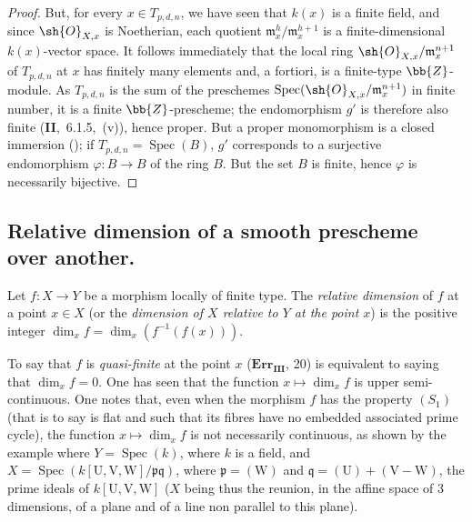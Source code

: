\begin{proof}
But, for every $x\in T_{p,d,n}$, we have seen that $k(x)$ is a finite field, and since $\sh{O}_{X,x}$ is Noetherian, each quotient $\mathfrak{m}_x^h/\mathfrak{m}_x^{h+1}$ is a finite-dimensional $k(x)$-vector space.
It follows immediately that the local ring $\sh{O}_{X,x}/\mathfrak{m}_x^{n+1}$ of $T_{p,d,n}$ at $x$ has finitely many elements and, a fortiori, is a finite-type $\bb{Z}$-module.
As $T_{p,d,n}$ is the sum of the preschemes $\operatorname{Spec}(\sh{O}_{X,x}/\mathfrak{m}_x^{n+1})$ in finite number, it is a finite $\bb{Z}$-prescheme; the endomorphism $g'$ is therefore also finite (\textbf{II},~6.1.5,~(v)), hence proper.
But a proper monomorphism is a closed immersion (); if $T_{p,d,n}=\operatorname{Spec}(B)$, $g'$ corresponds to a surjective endomorphism $\varphi:B\to B$ of the ring $B$.
But the set $B$ is finite, hence $\varphi$ is necessarily bijective.
\end{proof}


\subsection{Relative dimension of a smooth prescheme over another.}
\label{subsection:IV.17.10}


\begin{definition}[17.10.1]
\label{IV.17.10.1}
Let $f:X\to Y$ be a morphism locally of finite type.
The \emph{relative dimension} of $f$ at a point $x\in X$ (or the \emph{dimension of $X$ relative to $Y$ at the point $x$}) is the positive integer $\dim_x f=\dim_x(f^{-1}(f(x)))$.
\end{definition}

To say that $f$ is \emph{quasi-finite} at the point $x$ ($\mathbf{Err_{III}}$, 20) is equivalent to saying that $\dim_x f=0$.
One has seen  that the function $x\mapsto\dim_x f$ is upper semi-continuous.
One notes that, even when the morphism $f$ has the property $(S_1)$ (that is to say  is flat and such that its fibres have no embedded associated prime cycle), the function $x\mapsto\dim_x f$ is not necessarily continuous, as shown by the example where $Y=\operatorname{Spec}(k)$, where $k$ is a field, and $X=\operatorname{Spec}(k[\mathrm{U},\mathrm{V},\mathrm{W}]/\mathfrak{p}\mathfrak{q})$, where $\mathfrak{p}=(\mathrm{W})$ and $\mathfrak{q}=(\mathrm{U})+(\mathrm{V}-\mathrm{W})$, the prime ideals of $k[\mathrm{U},\mathrm{V},\mathrm{W}]$ ($X$ being thus the reunion, in the affine space of $3$ dimensions, of a plane and of a line non parallel to this plane).

